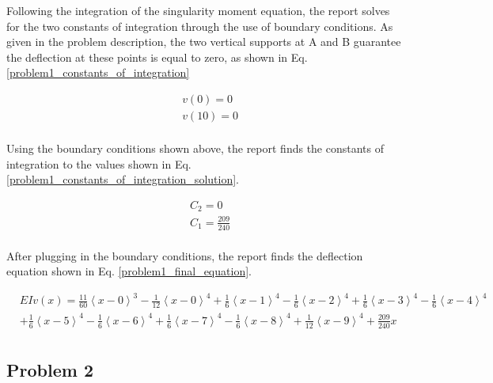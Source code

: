 \documentclass[a4paper]{article}
\begin{document}
Following the integration of the singularity moment equation, the report solves for the two constants of integration through the use of boundary conditions. As given in the problem description, the two vertical supports at A and B guarantee the deflection at these points is equal to zero, as shown in Eq. \ref{problem1_constants_of_integration}

\begin{equation}
\begin{split}
	& v(0) = 0 \\
	& v(10) = 0 \\
\end{split}
\label{problem1_constants_of_integration}
\end{equation}

Using the boundary conditions shown above, the report finds the constants of integration to the values shown in Eq. \ref{problem1_constants_of_integration_solution}.

\begin{equation}
\begin{split}
	& C_2 = 0 \\
	& C_1 = \frac{209}{240} \\
\end{split}
\label{problem1_constants_of_integration_solution}
\end{equation}

After plugging in the boundary conditions, the report finds the deflection equation shown in Eq. \ref{problem1_final_equation}.

\begin{equation}
\begin{split}
  & EI v(x) = \frac{11}{60}\left<x-0\right>^3 - \frac{1}{12}\left<x-0\right>^4 +  \frac{1}{6}\left<x-1\right>^4 - \frac{1}{6}\left<x-2\right>^4 + \frac{1}{6}\left<x-3\right>^4 - \frac{1}{6}\left<x-4\right>^4 \\  	  
&   +  \frac{1}{6}\left<x-5\right>^4 - \frac{1}{6}\left<x-6\right>^4  +  \frac{1}{6}\left<x-7\right>^4 - \frac{1}{6}\left<x-8\right>^4 +  \frac{1}{12}\left<x-9\right>^4 + \frac{209}{240}x\\
\end{split}
\label{problem1_final_equation}
\end{equation}


\subsection{Problem 2}
\end{document}
